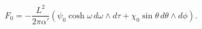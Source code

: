 \begin{equation}
F_0 = -\frac{L^2}{2\pi\alpha'}\left(\psi_0\cosh\omega\,d\omega\wedge d\tau
       + \chi_0\sin\theta\,d\theta\wedge d\phi\right).
\end{equation}

